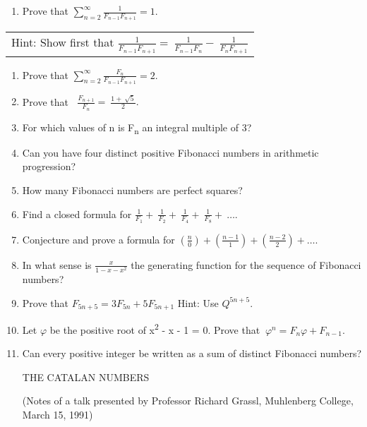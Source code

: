 \documentclass[10pt,letter]{article}
\renewenvironment{quote}
  {\begin{tabular}{|p{13cm}}}
  {\end{tabular}}
\begin{document}
\begin{enumerate}
\def\labelenumi{\arabic{enumi}.}

\item
  Prove that \(\sum_{n = 2}^{\infty}\frac{1}{F_{n - 1}F_{n + 1}} = 1.\)

\end{enumerate}
\begin{quote}
Hint: Show first that
\(\frac{1}{F_{n - 1}F_{n + 1}} = \ \frac{1}{F_{n - 1}F_{n}} - \ \frac{1}{F_{n}F_{n + 1}}\)

\end{quote}
\begin{enumerate}
\def\labelenumi{\arabic{enumi}.}

\item
  Prove that
  \(\sum_{n = 2}^{\infty}\frac{F_{n}}{F_{n - 1}F_{n + 1}} = 2.\)
\item
  Prove that
  \(\operatorname{}\frac{F_{n + 1}}{F_{n}} = \ \frac{1 + \ \sqrt{5}}{2}.\)
\item
  For which values of n is F\textsubscript{n} an integral multiple of 3?
\item
  Can you have four distinct positive Fibonacci numbers in arithmetic
  progression?
\item
  How many Fibonacci numbers are perfect squares?
\item
  Find a closed formula for
  \(\frac{1}{F_{1}} + \ \frac{1}{F_{2}} + \ \frac{1}{F_{4}} + \ \frac{1}{F_{8}} + \ \ldots.\)
\item
  Conjecture and prove a formula for
  \(\left( \frac{n}{0} \right) + \left( \frac{n - 1}{1} \right) + \left( \frac{n - 2}{2} \right) + \ldots.\)
\item
  In what sense is \(\frac{x}{1 - x - x^{2}}\) the generating function
  for the sequence of Fibonacci numbers?
\item
  Prove that \(F_{5n + 5} = 3F_{5n} + 5F_{5n + 1}\)
  Hint: Use \(Q^{5n + 5}\).
\item
  Let $\varphi$ be the positive root of x\textsuperscript{2} - x - 1 = 0. Prove
  that \(\ \varphi^{n} = F_{n}\varphi + F_{n - 1}\).
\item
  Can every positive integer be written as a sum of distinct Fibonacci
  numbers?

THE CATALAN NUMBERS

(Notes of a talk presented by Professor Richard Grassl, Muhlenberg
  College, March 15, 1991)

\end{enumerate}
\end{document}
